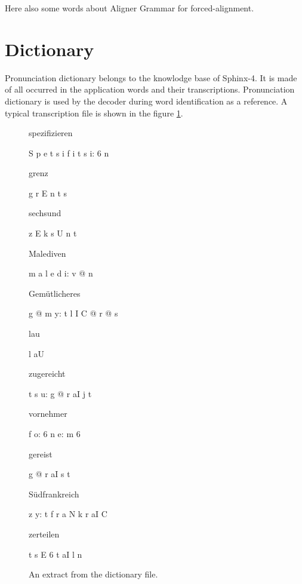 Here also some words about Aligner Grammar for forced-alignment. 

\section {Dictionary} 

Pronunciation dictionary belongs to the knowlodge base of Sphinx-4. It is made
of all occurred in the application words and their transcriptions. Pronunciation dictionary is used by the decoder during word identification as a reference. 
A typical transcription file is shown in the figure \ref {fig:dic}.
\newline
\begin{figure}[htbp]
%  
%  

spezifizieren	\begin{IPA} S p e t s i f i t s i: 6 n  \end{IPA}
\newline grenz	\begin{IPA}g r E n t s \end{IPA}
\newline sechsund	\begin{IPA}z E k s U n t\end{IPA}
\newline Malediven	\begin{IPA}m a l e d i: v @ n\end{IPA}
\newline Gemütlicheres	\begin{IPA}g @ m y: t l I C @ r @ s\end{IPA}
\newline lau	\begin{IPA}l aU\end{IPA}
\newline zugereicht	\begin{IPA}t s u: g @ r aI j t\end{IPA}
\newline vornehmer	\begin{IPA}f o: 6 n e: m 6\end{IPA}
\newline gereist	\begin{IPA}g @ r aI s t\end{IPA}
\newline Südfrankreich	\begin{IPA}z y: t f r a N k r aI C\end{IPA}
\newline zerteilen	\begin{IPA}t s E 6 t aI l n\end{IPA}
 \caption{An extract from the dictionary file.}
  \label{fig:dic}
\end {figure}
